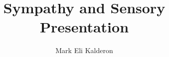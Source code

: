 \documentclass[12pt]{book}
\newcommand\myauthor{Mark Eli Kalderon}
\begin{document}
\author{\myauthor}
\title{Sympathy and Sensory Presentation}
\date{}

\maketitle
{}
\frontmatter
% 
\tableofcontents
% 
% 

\mainmatter





\backmatter


\nocite{Hamlyn:2002ys}
\nocite{Ross:1906fk}
\nocite{Ross:1961uq}
\nocite{Ross:1924aa}

 


\printindex
\end{document}
